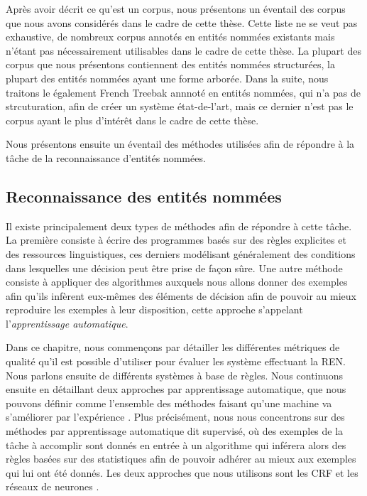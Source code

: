 \documentclass[PhD-Yoann-Dupont.tex]{subfiles}
\begin{document}
Après avoir décrit ce qu'est un corpus, nous présentons un éventail des corpus que nous avons considérés dans le cadre de cette thèse. Cette liste ne se veut pas exhaustive, de nombreux corpus annotés en entités nommées existants mais n'étant pas nécessairement utilisables dans le cadre de cette thèse. La plupart des corpus que nous présentons contiennent des entités nommées structurées, la plupart des entités nommées ayant une forme arborée. Dans la suite, nous traitons le également French Treebak annnoté en entités nommées, qui n'a pas de strcuturation, afin de créer un système état-de-l'art, mais ce dernier n'est pas le corpus ayant le plus d'intérêt dans le cadre de cette thèse.

Nous présentons ensuite un éventail des méthodes utilisées afin de répondre à la tâche de la reconnaissance d'entités nommées.

\subsection*{Reconnaissance des entités nommées}

Il existe principalement deux types de méthodes afin de répondre à cette tâche. La première consiste à écrire des programmes basés sur des règles explicites et des ressources linguistiques, ces derniers modélisant généralement des conditions dans lesquelles une décision peut être prise de façon sûre. Une autre méthode consiste à appliquer des algorithmes auxquels nous allons donner des exemples afin qu'ils infèrent eux-mêmes des éléments de décision afin de pouvoir au mieux reproduire les exemples à leur disposition, cette approche s'appelant l'\emph{apprentissage automatique}.

Dans ce chapitre, nous commençons par détailler les différentes métriques de qualité qu'il est possible d'utiliser pour évaluer les système effectuant la REN. Nous parlons ensuite de différents systèmes à base de règles. Nous continuons ensuite en détaillant deux approches par apprentissage automatique, que nous pouvons définir comme l'ensemble des méthodes faisant qu'une machine va s'améliorer par l'expérience \citep{cornuejols2011apprentissage}. Plus précisément, nous nous concentrons sur des méthodes  par apprentissage automatique dit supervisé, où des exemples de la tâche à accomplir sont donnés en entrée à un algorithme qui inférera alors des règles basées sur des statistiques afin de pouvoir adhérer au mieux aux exemples qui lui ont été donnés. Les deux approches que nous utilisons sont les CRF \citep{Lafferty01} et les réseaux de neurones \citep{mcculloch1943logical,rosenblatt1958perceptron,elman1990finding}.
\end{document}
